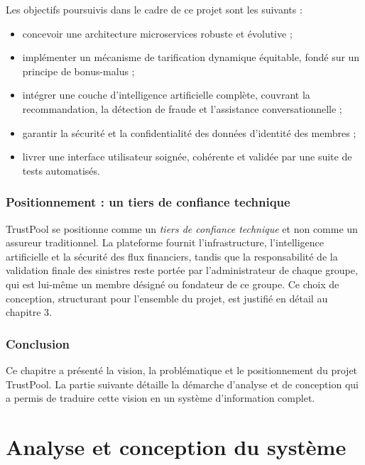 \documentclass[12pt,a4paper]{report}
\begin{document}
Les objectifs poursuivis dans le cadre de ce projet sont les suivants :
\begin{itemize}
    \item concevoir une architecture microservices robuste et évolutive ;
    \item implémenter un mécanisme de tarification dynamique équitable, fondé sur un principe de bonus-malus ;
    \item intégrer une couche d'intelligence artificielle complète, couvrant la recommandation, la détection de fraude et l'assistance conversationnelle ;
    \item garantir la sécurité et la confidentialité des données d'identité des membres ;
    \item livrer une interface utilisateur soignée, cohérente et validée par une suite de tests automatisés.
\end{itemize}

\section{Positionnement : un tiers de confiance technique}
TrustPool se positionne comme un \textit{tiers de confiance technique} et non comme un assureur traditionnel. La plateforme fournit l'infrastructure, l'intelligence artificielle et la sécurité des flux financiers, tandis que la responsabilité de la validation finale des sinistres reste portée par l'administrateur de chaque groupe, qui est lui-même un membre désigné ou fondateur de ce groupe. Ce choix de conception, structurant pour l'ensemble du projet, est justifié en détail au chapitre 3.

\section{Conclusion}
Ce chapitre a présenté la vision, la problématique et le positionnement du projet TrustPool. La partie suivante détaille la démarche d'analyse et de conception qui a permis de traduire cette vision en un système d'information complet.

\newpage

\part{Analyse et conception du système}

\end{document}

